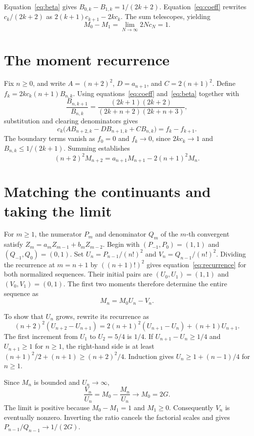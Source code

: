 \documentclass[11pt]{article}
\begin{document}
Equation~\eqref{eq:beta} gives \(B_{0,k}-B_{1,k}=1/(2k+2)\).
Equation~\eqref{eq:coeff} rewrites \(c_k/(2k+2)\) as
\(2(k+1)c_{k+1}-2kc_k\). The sum telescopes, yielding
\[
 M_0-M_1=\lim_{N\to\infty}2Nc_N=1.
\]

\section{The moment recurrence}

Fix \(n\ge0\), and write \(A=(n+2)^2\), \(D=a_{n+1}\), and
\(C=2(n+1)^2\). Define \(f_k=2kc_k(n+1)B_{n,k}\). Using
equations~\eqref{eq:coeff} and~\eqref{eq:beta} together with
\[
 \frac{B_{n,k+1}}{B_{n,k}}
 =\frac{(2k+1)(2k+2)}{(2k+n+2)(2k+n+3)},
\]
substitution and clearing denominators gives
\[
 c_k\bigl(A B_{n+2,k}-D B_{n+1,k}+C B_{n,k}\bigr)=f_k-f_{k+1}.
\]
The boundary terms vanish as \(f_0=0\) and \(f_k\to0\), since
\(2kc_k\to1\) and \(B_{n,k}\le1/(2k+1)\). Summing establishes
\begin{equation}
 (n+2)^2 M_{n+2}=a_{n+1}M_{n+1}-2(n+1)^2M_n .
 \label{eq:recurrence}
\end{equation}

\newpage
\section{Matching the continuants and taking the limit}

For \(m\ge1\), the numerator \(P_m\) and denominator \(Q_m\) of the
\(m\)-th convergent satisfy \(Z_m=a_m Z_{m-1}+b_m Z_{m-2}\).
Begin with \((P_{-1},P_0)=(1,1)\) and
\((Q_{-1},Q_0)=(0,1)\).
Set \(U_n=P_{n-1}/(n!)^2\) and \(V_n=Q_{n-1}/(n!)^2\).
Dividing the recurrence at \(m=n+1\) by \(((n+1)!)^2\) gives
equation~\eqref{eq:recurrence} for both normalized sequences.
Their initial pairs are \((U_0,U_1)=(1,1)\) and \((V_0,V_1)=(0,1)\).
The first two moments therefore determine the entire sequence as
\[
 M_n=M_0U_n-V_n.
\]

To show that \(U_n\) grows, rewrite its recurrence as
\[
 (n+2)^2(U_{n+2}-U_{n+1})
 =2(n+1)^2(U_{n+1}-U_n)+(n+1)U_{n+1}.
\]
The first increment from \(U_1\) to \(U_2=5/4\) is \(1/4\). If
\(U_{n+1}-U_n\ge1/4\) and \(U_{n+1}\ge1\) for \(n\ge1\), the
right-hand side is at least \((n+1)^2/2+(n+1)\ge(n+2)^2/4\).
Induction gives \(U_n\ge1+(n-1)/4\) for \(n\ge1\).

Since \(M_n\) is bounded and \(U_n\to\infty\),
\[
 \frac{V_n}{U_n}=M_0-\frac{M_n}{U_n}\longrightarrow M_0=2G.
\]
The limit is positive because \(M_0-M_1=1\) and \(M_1\ge0\).
Consequently \(V_n\) is eventually nonzero. Inverting the ratio cancels
the factorial scales and gives \(P_{n-1}/Q_{n-1}\to1/(2G)\).
\end{document}
